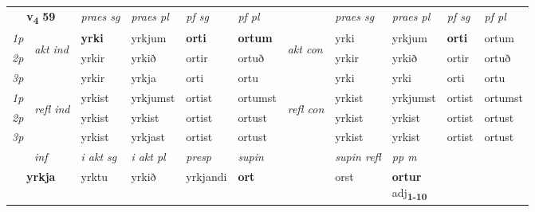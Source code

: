 \noindent
\begin{tabular}{lllllllllll} \toprule
\multicolumn{2}{c}{\textbf{v{\textsubscript{4}}} \Large{\textbf{59}}}  &  \textit{praes sg}  & \textit{praes pl}  &\textit{ pf sg} & \textit{pf pl} &  &  \textit{praes sg}  & \textit{praes pl}  & \textit{pf sg} & \textit{pf pl } \\*
	\cmidrule{3-6} \cmidrule{8-11}
 {\textit{1p}} & \multirow{3}{*}{\begin{turn}{90}\textit{akt ind}\end{turn}} & \textbf{yrki} & yrkjum & \textbf{orti} & \textbf{ortum} & \multirow{3}{*}{\begin{turn}{90}\textit{akt con}\end{turn}} &yrki & yrkjum & \textbf{orti} & ortum\\*
 {\textit{2p}} &  &  yrkir  & yrkið & ortir & ortuð & & yrkir & yrkið & ortir & ortuð \\*
{\textit{3p}} &  & yrkir & yrkja & orti & ortu & & yrki & yrki& orti & ortu \\*
\cmidrule{3-6} \cmidrule{8-11}
 {\textit{1p}} & \multirow{3}{*}{\begin{turn}{90}\textit{refl ind}\end{turn}}  & yrkist & yrkjumst & ortist & ortumst & \multirow{3}{*}{\begin{turn}{90}\textit{refl con}\end{turn}}  &yrkist & yrkjumst & ortist & ortumst \\*
 {\textit{2p}} &  & yrkist & yrkist & ortist & ortust & &yrkist & yrkist & ortist & ortust \\*
 {\textit{3p}}  & & yrkist & yrkjast & ortist & ortust & & yrkist & yrkist& ortist & ortust \\*
\cmidrule{3-6} \cmidrule{8-11}

   \multicolumn{2}{c}{\textit{inf}}  & \textit{i akt sg} & \textit{i akt pl}   & \textit{presp} & \textit{supin} && \textit{supin refl} & \textit{pp m} \\*
  \multicolumn{2}{c}{\textbf{yrkja}} & yrktu  & yrkið   & yrkjandi &  \textbf{ort} && orst & \specialcell{\textbf{ortur} \\ adj\textbf{\textsubscript{1-10}}} \\*
\end{tabular}

